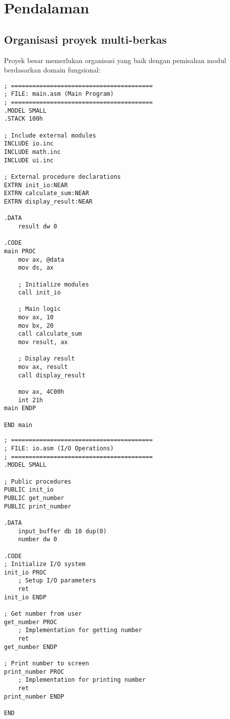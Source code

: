 \documentclass[../main.tex]{subfiles}
\begin{document}
    \section{Pendalaman}\label{sec:modular-pendalaman}
        \subsection{Organisasi proyek multi-berkas}
            Proyek besar memerlukan organisasi yang baik dengan pemisahan modul berdasarkan domain fungsional:

            \begin{lstlisting}[language={[x86masm]Assembler}, caption=Struktur Proyek Multi-Berkas, label={lst:multi-file-structure}]
; ========================================
; FILE: main.asm (Main Program)
; ========================================
.MODEL SMALL
.STACK 100h

; Include external modules
INCLUDE io.inc
INCLUDE math.inc
INCLUDE ui.inc

; External procedure declarations
EXTRN init_io:NEAR
EXTRN calculate_sum:NEAR
EXTRN display_result:NEAR

.DATA
    result dw 0

.CODE
main PROC
    mov ax, @data
    mov ds, ax
    
    ; Initialize modules
    call init_io
    
    ; Main logic
    mov ax, 10
    mov bx, 20
    call calculate_sum
    mov result, ax
    
    ; Display result
    mov ax, result
    call display_result
    
    mov ax, 4C00h
    int 21h
main ENDP

END main
            \end{lstlisting}

            \begin{lstlisting}[language={[x86masm]Assembler}, caption=File: io.asm (I/O Module), label={lst:io-module}]
; ========================================
; FILE: io.asm (I/O Operations)
; ========================================
.MODEL SMALL

; Public procedures
PUBLIC init_io
PUBLIC get_number
PUBLIC print_number

.DATA
    input_buffer db 10 dup(0)
    number dw 0

.CODE
; Initialize I/O system
init_io PROC
    ; Setup I/O parameters
    ret
init_io ENDP

; Get number from user
get_number PROC
    ; Implementation for getting number
    ret
get_number ENDP

; Print number to screen
print_number PROC
    ; Implementation for printing number
    ret
print_number ENDP

END
            \end{lstlisting}
\end{document}
